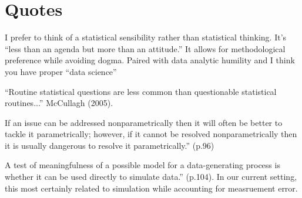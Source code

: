 \documentclass[11pt]{article}
\numberwithin{equation}{section}
\theoremstyle{plain}
\begin{document}
\section{Quotes}

I prefer to think of a statistical sensibility rather than statistical thinking. It’s “less than an agenda but more than an attitude.”  It allows for methodological preference while avoiding dogma. Paired with data analytic humility and I think you have proper “data science”

“Routine statistical questions are less common than questionable statistical routines...” McCullagh (2005).

If an issue can be addressed nonparametrically then it will often be better to tackle it parametrically; however, if it cannot be resolved nonparametrically then it is usually dangerous to resolve it parametrically.” (p.96)

A test of meaningfulness of a possible model for a data-generating process is whether it can be used directly to simulate data.” (p.104).  In our current setting, this most certainly related to simulation while accounting for measruement error.
\end{document}
